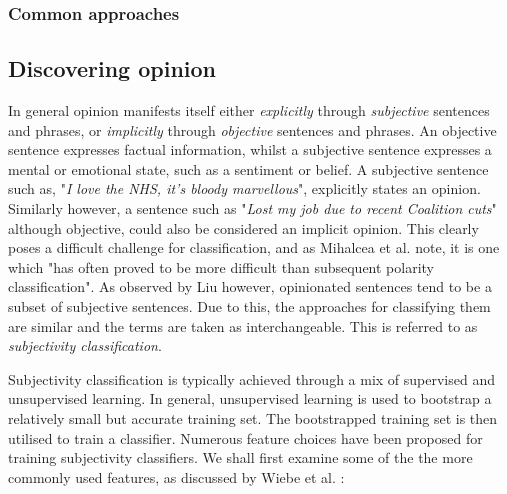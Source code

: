 \subsubsection{Common approaches}

\subsection{Discovering opinion}
\label{background:discovering_opinion}

In general opinion manifests itself either \emph{explicitly} through \emph{subjective} sentences and phrases, or \emph{implicitly} through \emph{objective} sentences and phrases. An objective sentence expresses factual information, whilst a subjective sentence expresses a mental or emotional state, such as a sentiment or belief. A subjective sentence such as, "\emph{I love the NHS, it's bloody marvellous}", explicitly states an opinion. Similarly however, a sentence such as "\emph{Lost my job due to recent Coalition cuts}" although objective, could also be considered an implicit opinion. This clearly poses a difficult challenge for classification, and as Mihalcea et al. \cite{Mihalcea:2007uh} note, it is one which "has often proved to be more difficult than subsequent polarity classification". As observed by Liu \cite{Liu:2010tm} however, opinionated sentences tend to be a subset of subjective sentences. Due to this, the approaches for classifying them are similar and the terms are taken as interchangeable. This is referred to as \emph{subjectivity classification}.

Subjectivity classification is typically achieved through a mix of supervised and unsupervised learning. In general, unsupervised learning is used to bootstrap a relatively small but accurate training set. The bootstrapped training set is then utilised to train a classifier. Numerous feature choices have been proposed for training subjectivity classifiers. We shall first examine some of the the more commonly used features, as discussed by Wiebe et al. \cite{Wiebe:1999cj}:

